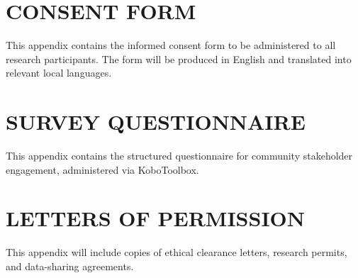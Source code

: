 \documentclass[12pt,a4paper]{report}
\begin{document}
\begin{appendices}
\chapter{CONSENT FORM}
\label{app:consent}
This appendix contains the informed consent form to be administered to all research participants. The form will be produced in English and translated into relevant local languages.

\chapter{SURVEY QUESTIONNAIRE}
\label{app:questionnaire}
This appendix contains the structured questionnaire for community stakeholder engagement, administered via KoboToolbox.

\chapter{LETTERS OF PERMISSION}
\label{app:permissions}
This appendix will include copies of ethical clearance letters, research permits, and data-sharing agreements.

\end{appendices}
\end{document}
